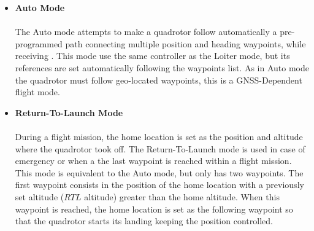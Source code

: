 \begin{itemize}
\item \textbf{Auto Mode}\\\\
The Auto mode attempts to make a quadrotor follow automatically a pre-programmed path connecting multiple position and heading waypoints, while receiving . This mode use the same controller as the Loiter mode, but its references are set automatically following the waypoints list. As in Auto mode the quadrotor must follow geo-located waypoints, this is a GNSS-Dependent flight mode.

\item \textbf{Return-To-Launch Mode}\\\\
During a flight mission, the home location is set as the position and altitude where the quadrotor took off. The Return-To-Launch mode is used in case of emergency or when a the last waypoint is reached within a flight mission. This mode is equivalent to the Auto mode, but only has two waypoints. The first waypoint consists in the position of the home location with a previously set altitude ($RTL$ altitude) greater than the home altitude. When this waypoint is reached, the home location is set as the following waypoint so that the quadrotor starts its landing keeping the position controlled.

\end{itemize}



